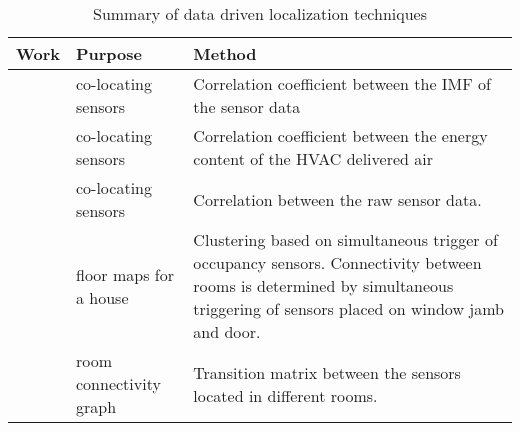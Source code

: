 \begin{table}[!ht]
\centering
\caption{Summary of data driven localization techniques}
\label{tab:litReview}
\begin{tabularx}{\textwidth}{|X|X|X|}
\hline
Work                                                                               & Purpose                                                                                                     & Method                                                                                                                                                                                                                              \\ \hline
\centering\text{\citeauthor{Hong:2013:TAS:2528282.2528302}}\text{\cite{Hong:2013:TAS:2528282.2528302}} & co-locating sensors                                                                                         & Correlation coefficient between the IMF of the sensor data \\ \hline
\centering\text{\citeauthor{doi:10.1061/9780784413616.226}}\text{\cite{doi:10.1061/9780784413616.226}} & co-locating sensors                                                                                         & Correlation coefficient between the energy content of the HVAC delivered air \\ \hline
\centering\text{\citeauthor{Koc:2014:CLC:2674061.2674075}}\text{\cite{Koc:2014:CLC:2674061.2674075}}      & co-locating sensors                                                                                         & Correlation between the raw sensor data.                                                                                                                                                                                            \\ \hline
\centering\text{\citeauthor{Lu:2014:SBS:2648771.2629441}}\text{\cite{Lu:2014:SBS:2648771.2629441}}      & floor maps for a house                                                                                      & Clustering based on simultaneous trigger of occupancy sensors. Connectivity between rooms is determined by  simultaneous triggering of sensors placed on window jamb and door. \\ \hline
\centering\text{\citeauthor{ellis2012creating}}\text{\cite{ellis2012creating}}                         & room connectivity graph                                                                                     & Transition matrix between the sensors located in different rooms.                                                                                                                                                                   \\ \hline

\end{tabularx}
\end{table}
